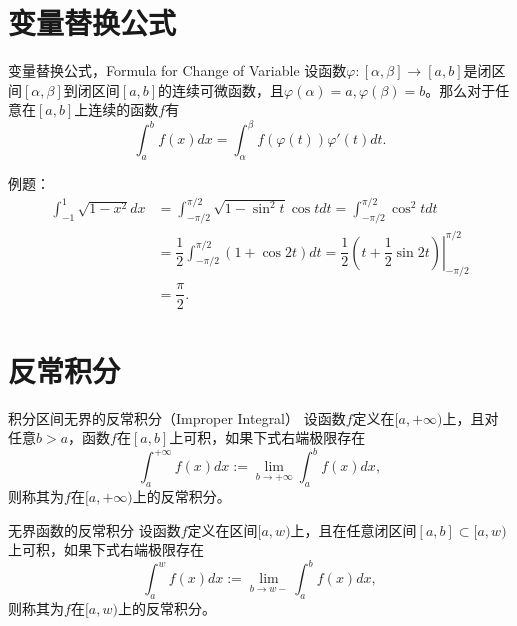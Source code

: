 

\section{变量替换公式}


\begin{frame}

\begin{block}{变量替换公式，Formula for Change of Variable}
设函数$\varphi: [\alpha,\beta] \to [a,b]$是闭区间$[\alpha,\beta]$到闭区间$[a,b]$的连续可微函数，且$\varphi(\alpha) = a, \varphi(\beta) = b$。那么对于任意在$[a,b]$上连续的函数$f$有
$$\int_a^b f(x)dx = \int_{\alpha}^{\beta} f(\varphi(t))\varphi'(t)dt.$$
\end{block}

\pause

例题：
\begin{align*}
\int_{-1}^{1} \sqrt{1-x^2} dx & = \int_{-\pi/2}^{\pi/2} \sqrt{1-\sin^2t}\cos t dt = \int_{-\pi/2}^{\pi/2} \cos^2 t dt \\
& = \dfrac{1}{2} \int_{-\pi/2}^{\pi/2} (1+\cos 2t) dt = \left.\dfrac{1}{2}\left(t + \dfrac{1}{2}\sin 2t \right)\right\vert_{-\pi/2}^{\pi/2} \\
& = \dfrac{\pi}{2}.
\end{align*}

\end{frame}


\section{反常积分}


\begin{frame}

\begin{block}{积分区间无界的反常积分（Improper Integral）}
设函数$f$定义在$[a,+\infty)$上，且对任意$b>a$，函数$f$在$[a,b]$上可积，如果下式右端极限存在
$$\int_a^{+\infty} f(x)dx := \lim\limits_{b\to+\infty} \int_a^b f(x)dx,$$
则称其为$f$在$[a,+\infty)$上的反常积分。
\end{block}

\pause

\begin{block}{无界函数的反常积分}
设函数$f$定义在区间$[a,w)$上，且在任意闭区间$[a,b]\subset [a,w)$上可积，如果下式右端极限存在
$$\int_a^w f(x)dx := \lim\limits_{b\to w-} \int_a^b f(x)dx,$$
则称其为$f$在$[a,w)$上的反常积分。
\end{block}

\end{frame}


